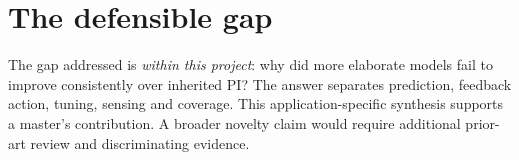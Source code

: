 \section{The defensible gap}
The gap addressed is \emph{within this project}: why did more elaborate models fail to improve consistently over inherited PI? The answer separates prediction, feedback action, tuning, sensing and coverage. This application-specific synthesis supports a master's contribution. A broader novelty claim would require additional prior-art review and discriminating evidence.

